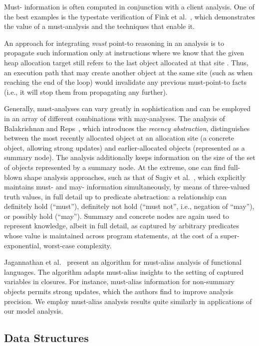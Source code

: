 Must- information is often computed in conjunction with a client analysis. One of the best examples is the typestate verification of Fink et al.~\cite{issta:2006:Fink}, which demonstrates the value of a must-analysis and the techniques that enable it.

An approach for integrating \emph{must} point-to reasoning in an analysis is to propagate such information only at instructions where we know that the given heap allocation target still refers to the last object allocated at that site \cite{popl:1995:Altucher}. Thus, an execution path that may create another object at the same site (such as when reaching the end of the loop) would invalidate any previous must-point-to facts (i.e., it will stop them from propagating any further).

Generally, must-analyses can vary greatly in sophistication and can be employed in an array of different combinations with may-analyses. The analysis of Balakrishnan and Reps~\cite{sas:2006:Balakrishnan}, which introduces the \emph{recency abstraction}, distinguishes between the most recently allocated object at an allocation site (a concrete object, allowing strong updates) and earlier-allocated objects (represented as a summary node). The analysis additionally keeps information on the size of the set of objects represented by a summary node. At the extreme, one can find full-blown shape analysis approaches, such as that of Sagiv et al.~\cite{article:2002:Sagiv}, which explicitly maintains must- and may- information simultaneously, by means of three-valued truth values, in full detail up to predicate abstraction: a relationship can definitely hold (``must''), definitely not hold (``must not'', i.e., negation of ``may''), or possibly hold (``may''). Summary and concrete nodes are again used to represent knowledge, albeit in full detail, as captured by arbitrary predicates whose value is maintained across program statements, at the cost of a super-exponential, worst-case complexity.

Jagannathan et al.~\cite{popl:1998:Jagannathan} present an algorithm for must-alias analysis of functional languages. The algorithm adapts must-alias insights to the setting of captured variables in closures. For instance, must-alias information for non-summary objects permits strong updates, which the authors find to improve analysis precision. We employ must-alias analysis results quite similarly in applications of our model analysis.


\subsection*{Data Structures}

